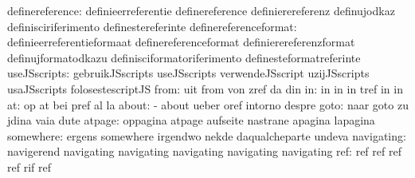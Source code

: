                  definereference: definieerreferentie              definereference
                                  definierereferenz                definujodkaz
                                  definisciriferimento             definestereferinte
           definereferenceformat: definieerreferentieformaat       definereferenceformat
                                  definierereferenzformat          definujformatodkazu
                                  definisciformatoriferimento      definesteformatreferinte
                    useJSscripts: gebruikJSscripts                 useJSscripts
                                  verwendeJSscript                 uzijJSscripts
                                  usaJSscripts                     folosestescriptJS
                            from: uit                              from
                                  von                              zref
                                  da                               din
                              in: in                               in
                                  in                               tref
                                  in                               in
                              at: op                               at
                                  bei                              pref
                                  al                               la %
                           about: -                                about
                                  ueber                            oref
                                  intorno                          despre
                            goto: naar                             goto
                                  zu                               jdina
                                  vaia                             dute
                          atpage: oppagina                         atpage
                                  aufseite                         nastrane
                                  apagina                          lapagina
                       somewhere: ergens                           somewhere
                                  irgendwo                         nekde
                                  daqualcheparte                   undeva
navigating: navigerend navigating
            navigating navigating
            navigating navigating
                             ref: ref                              ref
                                  ref                              ref
                                  rif                              ref
